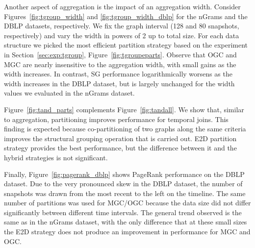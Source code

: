 Another aspect of aggregation is the impact of an aggregation width.
Consider Figures~\ref{fig:tgroup_width} and
\ref{fig:tgroup_width_dblp} for the nGrams and the DBLP datasets,
respectively.  We fix the graph interval (128 and 80 snapshots,
respectively) and vary the width in powers of 2 up to total size.  For
each data structure we picked the most efficient partition strategy
based on the experiment in Section~\ref{sec:exp:tgroup},
Figure~\ref{fig:tgroupeparts}.  Observe that OGC and MGC are nearly
insensitive to the aggregation width, with small gains as the width
increases.  In contrast, SG performance logarithmically worsens as the
width increases in the DBLP dataset, but is largely unchanged for the
width values we evaluated in the nGrams dataset.

Figure~\ref{fig:tand_parts} complements Figure~\ref{fig:tandall}.  We
show that, similar to aggregation, partitioning improves performance
for temporal joins.  This finding is expected because co-partitioning
of two graphs along the same criteria improves the structural grouping
operation that is carried out. E2D partition strategy provides the
best performance, but the difference between it and the hybrid
strategies is not significant.

Finally, Figure~\ref{fig:pagerank_dblp} shows PageRank performance on
the DBLP dataset. Due to the very pronounced skew in the DBLP dataset,
the number of snapshots was drawn from the most recent to the left on
the timeline.  The same number of partitions was used for MGC/OGC
because the data size did not differ significantly between different
time intervals.  The general trend observed is the same as in the
nGrams dataset, with the only difference that at these small sizes the
E2D strategy does not produce an improvement in performance for MGC
and OGC.
